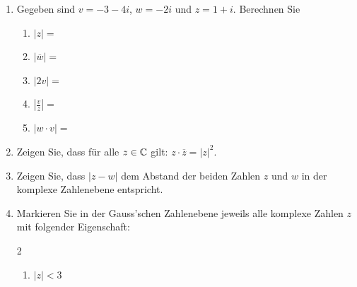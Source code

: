 \begin{ueb}
    {}{}
    \begin{enumerate}
        \item  Gegeben sind $v=-3-4i$, $w=-2i$ und $z=1+i$. Berechnen Sie
        \begin{enumerate}
            \item $|z|=$
            \vfill
            \item $|\overline{w}|=$
            \vfill
            \item $|2v|=$
            \vfill
            \item $\left|\frac{v}{z}\right|=$
            \vfill
            \item $\left|w\cdot v\right|=$
            \vfill
        \end{enumerate}
        \item Zeigen Sie, dass für alle $z\in \mathbb{C}$ gilt: $z\cdot \overline{z}=|z|^2$.
        \item Zeigen Sie, dass $|z-w|$ dem Abstand der beiden Zahlen $z$ und $w$ in der komplexe Zahlenebene entspricht.
        \item Markieren Sie in der Gauss'schen Zahlenebene jeweils alle komplexe Zahlen $z$ mit folgender Eigenschaft:

        \begin{multicols}{2}
        \begin{enumerate}
            \item $|z|<3$
            \begin{center}
        
            \end{center}
            

\end{enumerate}
\end{multicols}
\end{enumerate}
\end{ueb}
